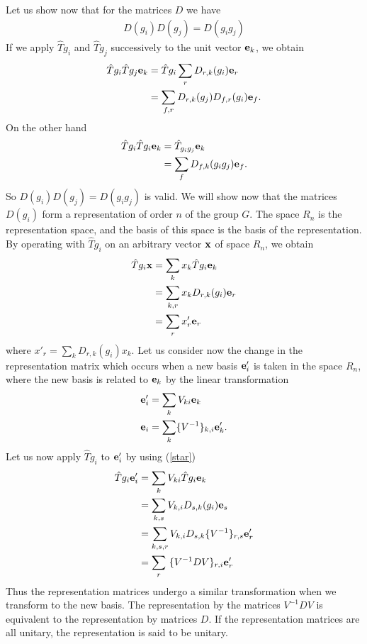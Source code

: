Let us show now that for the matrices $D$ we have
\begin{align}
    D(g_i)D(g_j)=D(g_ig_j)
\end{align}
If we apply $\hat{T}g_i$ and $\hat{T}g_j$ successively to the unit vector
$\vb{e}_k$, we obtain
\begin{align}
    \hat{T}g_i\hat{T}g_j\vb{e}_k&=\hat{T}g_i\sum_rD_{r,k}(g_i)\vb{e}_r\\
                                &=\sum_{f,r}D_{r,k}(g_j)D_{f,r}(g_i)\vb{e}_f.
\end{align}
On the other hand
\begin{align}
    \hat{T}g_i\hat{T}g_i\vb{e}_k&=\hat{T}_{g_ig_j}\vb{e}_k\\
                                &=\sum_fD_{f,k}(g_ig_j)\vb{e}_f.
\end{align}
So $D(g_i)D(g_j)=D(g_ig_j)$ is valid. We will show now that the matrices $D(g_i)$
form a representation of order $n$ of the group $G$. The space $R_n$ is the
representation space, and the basis of this space is the basis of the
representation. By operating with $\hat{T}g_i$ on an arbitrary vector $\vb{x}$ of
space $R_n$, we obtain
\begin{align}
    \hat{T}g_i\vb{x}&=\sum_kx_k\hat{T}g_i\vb{e}_k\\
                    &=\sum_{k,r}x_kD_{r,k}(g_i)\vb{e}_r\\
                    &=\sum_rx'_r\vb{e}_r
\end{align}
where $x'_r=\sum_kD_{r,k}(g_i)x_k$. Let us consider now the change in the
representation matrix which occurs when a new basis $\vb{e}'_i$ is taken in the
space $R_n$, where the new basis is related to $\vb{e}_k$ by the linear
transformation
\begin{align}
    \vb{e}'_i&=\sum_k V_{ki}\vb{e}_k\label{star}\\
    \vb{e}_i&=\sum_k\{V^{-1}\}_{k,i}\vb{e}'_k.
\end{align}
Let us now apply $\hat{T}g_i$ to $\vb{e}'_i$ by using (\autoref{star})
\begin{align}
    \hat{T}g_i\vb{e}'_i&=\sum_kV_{ki}\hat{T}g_i\vb{e}_k\\
                       &=\sum_{k,s}V_{k,i}D_{s,k}(g_i)\vb{e}_s\\
                       &=\sum_{k,s,r}V_{k,i}D_{s,k}\{V^{-1}\}_{r,s}\vb{e}'_r\\
                       &=\sum_r \{V^{-1}DV\}_{r,i}\vb{e}'_r
\end{align}
Thus the representation matrices undergo a similar transformation when we
transform to the new basis. The representation by the matrices $V^{-1}DV$ is
equivalent to the representation by matrices $D$. If the representation
matrices are all unitary, the representation is said to be unitary.

